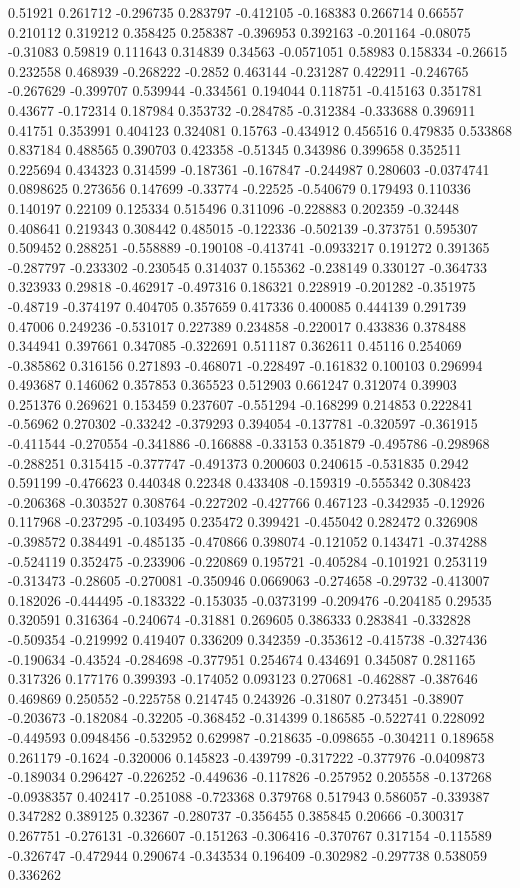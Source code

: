0.51921 0.261712 -0.296735 0.283797 -0.412105 -0.168383 0.266714 0.66557 0.210112 0.319212 0.358425 0.258387 -0.396953 0.392163 -0.201164 -0.08075 -0.31083 0.59819 0.111643 0.314839 0.34563 -0.0571051 0.58983 0.158334 -0.26615 0.232558 0.468939 -0.268222 -0.2852 0.463144 -0.231287 0.422911 -0.246765 -0.267629 -0.399707 0.539944 -0.334561 0.194044 0.118751 -0.415163 0.351781 0.43677 -0.172314 0.187984 0.353732 -0.284785 -0.312384 -0.333688 0.396911 0.41751 0.353991 0.404123 0.324081 0.15763 -0.434912 0.456516 0.479835 0.533868 0.837184 0.488565 0.390703 0.423358 -0.51345 0.343986 0.399658 0.352511 0.225694 0.434323 0.314599 -0.187361 -0.167847 -0.244987 0.280603 -0.0374741 0.0898625 0.273656 0.147699 -0.33774 -0.22525 -0.540679 0.179493 0.110336 0.140197 0.22109 0.125334 0.515496 0.311096 -0.228883 0.202359 -0.32448 0.408641 0.219343 0.308442 0.485015 -0.122336 -0.502139 -0.373751 0.595307 0.509452 0.288251 -0.558889 -0.190108 -0.413741 -0.0933217 0.191272 0.391365 -0.287797 -0.233302 -0.230545 0.314037 0.155362 -0.238149 0.330127 -0.364733 0.323933 0.29818 -0.462917 -0.497316 0.186321 0.228919 -0.201282 -0.351975 -0.48719 -0.374197 0.404705 0.357659 0.417336 0.400085 0.444139 0.291739 0.47006 0.249236 -0.531017 0.227389 0.234858 -0.220017 0.433836 0.378488 0.344941 0.397661 0.347085 -0.322691 0.511187 0.362611 0.45116 0.254069 -0.385862 0.316156 0.271893 -0.468071 -0.228497 -0.161832 0.100103 0.296994 0.493687 0.146062 0.357853 0.365523 0.512903 0.661247 0.312074 0.39903 0.251376 0.269621 0.153459 0.237607 -0.551294 -0.168299 0.214853 0.222841 -0.56962 0.270302 -0.33242 -0.379293 0.394054 -0.137781 -0.320597 -0.361915 -0.411544 -0.270554 -0.341886 -0.166888 -0.33153 0.351879 -0.495786 -0.298968 -0.288251 0.315415 -0.377747 -0.491373 0.200603 0.240615 -0.531835 0.2942 0.591199 -0.476623 0.440348 0.22348 0.433408 -0.159319 -0.555342 0.308423 -0.206368 -0.303527 0.308764 -0.227202 -0.427766 0.467123 -0.342935 -0.12926 0.117968 -0.237295 -0.103495 0.235472 0.399421 -0.455042 0.282472 0.326908 -0.398572 0.384491 -0.485135 -0.470866 0.398074 -0.121052 0.143471 -0.374288 -0.524119 0.352475 -0.233906 -0.220869 0.195721 -0.405284 -0.101921 0.253119 -0.313473 -0.28605 -0.270081 -0.350946 0.0669063 -0.274658 -0.29732 -0.413007 0.182026 -0.444495 -0.183322 -0.153035 -0.0373199 -0.209476 -0.204185 0.29535 0.320591 0.316364 -0.240674 -0.31881 0.269605 0.386333 0.283841 -0.332828 -0.509354 -0.219992 0.419407 0.336209 0.342359 -0.353612 -0.415738 -0.327436 -0.190634 -0.43524 -0.284698 -0.377951 0.254674 0.434691 0.345087 0.281165 0.317326 0.177176 0.399393 -0.174052 0.093123 0.270681 -0.462887 -0.387646 0.469869 0.250552 -0.225758 0.214745 0.243926 -0.31807 0.273451 -0.38907 -0.203673 -0.182084 -0.32205 -0.368452 -0.314399 0.186585 -0.522741 0.228092 -0.449593 0.0948456 -0.532952 0.629987 -0.218635 -0.098655 -0.304211 0.189658 0.261179 -0.1624 -0.320006 0.145823 -0.439799 -0.317222 -0.377976 -0.0409873 -0.189034 0.296427 -0.226252 -0.449636 -0.117826 -0.257952 0.205558 -0.137268 -0.0938357 0.402417 -0.251088 -0.723368 0.379768 0.517943 0.586057 -0.339387 0.347282 0.389125 0.32367 -0.280737 -0.356455 0.385845 0.20666 -0.300317 0.267751 -0.276131 -0.326607 -0.151263 -0.306416 -0.370767 0.317154 -0.115589 -0.326747 -0.472944 0.290674 -0.343534 0.196409 -0.302982 -0.297738 0.538059 0.336262 